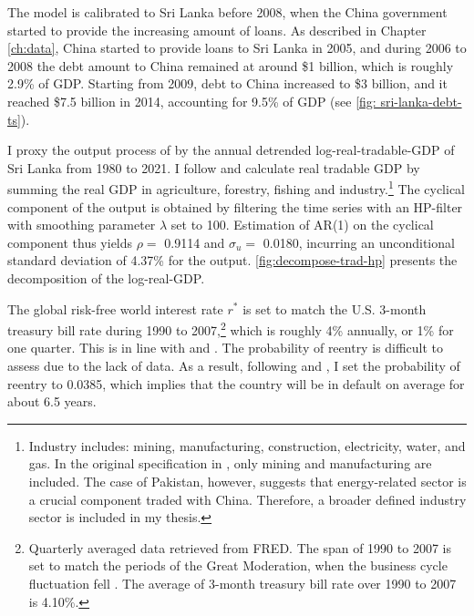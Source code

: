 The model is calibrated to Sri Lanka before 2008, when the China government started to provide the increasing amount of loans.
As described in Chapter \ref{ch:data}, China started to provide loans to Sri Lanka in 2005, and during 2006 to 2008 the debt amount to China remained at around \$1 billion, which is roughly 2.9\% of GDP. Starting from 2009, debt to China increased to \$3 billion, and it reached \$7.5 billion in 2014, accounting for 9.5\% of GDP
(see \autoref{fig: sri-lanka-debt-ts}).

I proxy the output process of  by the annual detrended log-real-tradable-GDP of Sri Lanka from 1980 to 2021. I follow \citet{Na-18} and calculate real tradable GDP by summing the real GDP in agriculture, forestry, fishing and industry.\footnote{
    Industry includes: mining, manufacturing, construction, electricity, water, and gas. In the original specification in \citet{Na-18}, only mining and manufacturing are included. The case of Pakistan, however, suggests that energy-related sector is a crucial component traded with China. Therefore, a broader defined industry sector is included in my thesis.
}
The cyclical component of the output is obtained by filtering the time series with an HP-filter with smoothing parameter $\lambda$ set to 100.
Estimation of AR(1) on the cyclical component thus yields $\rho = $ 0.9114 and $\sigma_u = $ 0.0180, incurring an unconditional standard deviation of 4.37\% for the output.\footnotemark{} \autoref{fig:decompose-trad-hp} presents the decomposition of the log-real-GDP.

The global risk-free world interest rate $r^*$ is set to match the U.S. 3-month treasury bill rate during 1990 to 2007,\footnote{
    Quarterly averaged data retrieved from FRED. The span of 1990 to 2007 is set to match the periods of the Great Moderation, when the business cycle fluctuation fell \citep{FedHistory-GreatModeration}. The average of 3-month treasury bill rate over 1990 to 2007 is 4.10\%.
} which is roughly 4\% annually, or 1\% for one quarter. This is in line with \citet{Chatterjee-12} and \citet{Na-18}.
The probability of reentry is difficult to assess due to the lack of data. As a result, following \citet*{Chatterjee-12} and \citet*{Hinrichsen_2020-chapter4}, I set the probability of reentry to 0.0385, which implies that the country will be in default on average for about 6.5 years.

